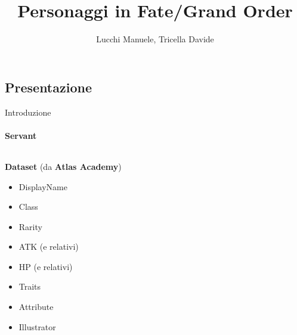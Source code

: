 \documentclass{beamer}
\title{Personaggi in Fate/Grand Order} %
\author{Lucchi Manuele, Tricella Davide}
\begin{document}
\frame[c]{\maketitle}

\begin{darkframes}

  \section{Presentazione}

  \begin{frame}{Introduzione}
    \framesubtitle{Servant}
    \begin{columns}
      \begin{column}{0.5\textwidth}
        \textbf{Dataset} (da \textbf{Atlas Academy})
        \begin{itemize}
          \item DisplayName
          \item Class
          \item Rarity
          \item ATK (e relativi)
          \item HP (e relativi)
          \item Traits
          \item Attribute
          \item Illustrator
        \end{itemize}
      \end{column}
      \begin{column}{0.5\textwidth}
        \begin{figure}
          \centering

\end{figure}
\end{column}
\end{columns}
\end{frame}
\end{darkframes}
\end{document}
